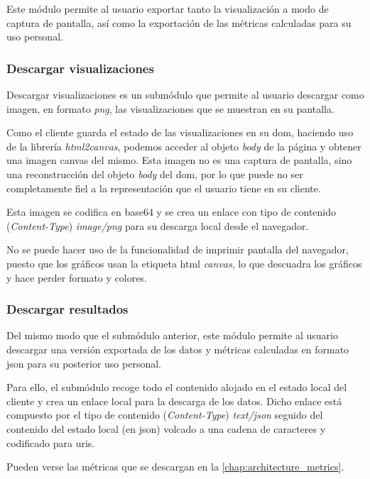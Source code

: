 Este módulo permite al usuario exportar tanto la visualización a modo de captura de pantalla, así como la exportación de las métricas calculadas para su uso personal.

\subsubsection{Descargar visualizaciones}

Descargar visualizaciones es un submódulo que permite al usuario descargar como imagen, en formato \textit{png}, las visualizaciones que se muestran en su pantalla.

Como el cliente guarda el estado de las visualizaciones en su \acrshort{dom}, haciendo uso de la librería \textit{html2canvas}, podemos acceder al objeto \textit{body} de la página y obtener una imagen canvas del mismo. Esta imagen no es una captura de pantalla, sino una reconstrucción del objeto \textit{body} del \acrshort{dom}, por lo que puede no ser completamente fiel a la representación que el usuario tiene en su cliente.

Esta imagen se codifica en base64 y se crea un enlace con tipo de contenido (\textit{Content-Type}) \textit{image/png}  para su descarga local desde el navegador.

No se puede hacer uso de la funcionalidad de imprimir pantalla del navegador, puesto que los gráficos usan la etiqueta \acrshort{html} \textit{canvas}, lo que descuadra los gráficos y hace perder formato y colores.

\subsubsection{Descargar resultados}

Del mismo modo que el submódulo anterior, este módulo permite al usuario descargar una versión exportada de los datos y métricas calculadas en formato \acrshort{json} para su posterior uso personal.

Para ello, el submódulo recoge todo el contenido alojado en el estado local del cliente y crea un enlace local para la descarga de los datos. Dicho enlace está compuesto por el tipo de contenido (\textit{Content-Type}) \textit{text/json} seguido del contenido del estado local (en \acrshort{json}) volcado a una cadena de caracteres y codificado para \acrshort{uri}s.

Pueden verse las métricas que se descargan en la \autoref{chap:architecture_metrics}.



